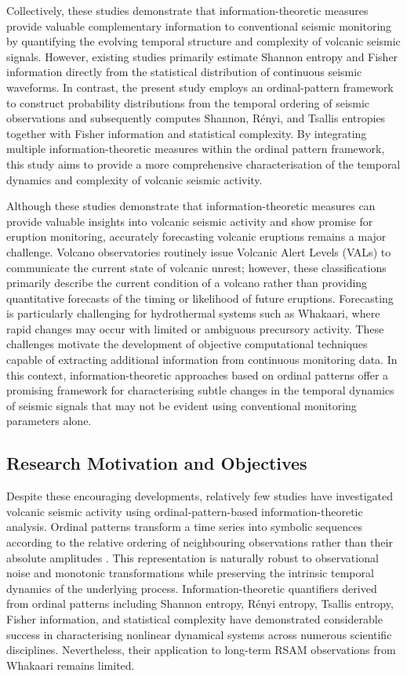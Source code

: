 \documentclass[12pt,a4paper]{article}
\begin{document}
Collectively, these studies demonstrate that information-theoretic measures provide valuable complementary information to conventional seismic monitoring by quantifying the evolving temporal structure and complexity of volcanic seismic signals. However, existing studies primarily estimate Shannon entropy and Fisher information directly from the statistical distribution of continuous seismic waveforms. In contrast, the present study employs an ordinal-pattern framework to construct probability distributions from the temporal ordering of seismic observations and subsequently computes Shannon, R\'enyi, and Tsallis entropies together with Fisher information and statistical complexity. By integrating multiple information-theoretic measures within the ordinal pattern framework, this study aims to provide a more comprehensive characterisation of the temporal dynamics and complexity of volcanic seismic activity.

Although these studies demonstrate that information-theoretic measures can provide valuable insights into volcanic seismic activity and show promise for eruption monitoring, accurately forecasting volcanic eruptions remains a major challenge. Volcano observatories routinely issue Volcanic Alert Levels (VALs) to communicate the current state of volcanic unrest; however, these classifications primarily describe the current condition of a volcano rather than providing quantitative forecasts of the timing or likelihood of future eruptions. Forecasting is particularly challenging for hydrothermal systems such as Whakaari, where rapid changes may occur with limited or ambiguous precursory activity. These challenges motivate the development of objective computational techniques capable of extracting additional information from continuous monitoring data. In this context, information-theoretic approaches based on ordinal patterns offer a promising framework for characterising subtle changes in the temporal dynamics of seismic signals that may not be evident using conventional monitoring parameters alone.

\subsection{Research Motivation and Objectives}

Despite these encouraging developments, relatively few studies have investigated volcanic seismic activity using ordinal-pattern-based information-theoretic analysis. Ordinal patterns transform a time series into symbolic sequences according to the relative ordering of neighbouring observations rather than their absolute amplitudes \cite{Bandt2002}. This representation is naturally robust to observational noise and monotonic transformations while preserving the intrinsic temporal dynamics of the underlying process. Information-theoretic quantifiers derived from ordinal patterns including Shannon entropy, R\'enyi entropy, Tsallis entropy, Fisher information, and statistical complexity have demonstrated considerable success in characterising nonlinear dynamical systems across numerous scientific disciplines. Nevertheless, their application to long-term RSAM observations from Whakaari remains limited.
\end{document}

